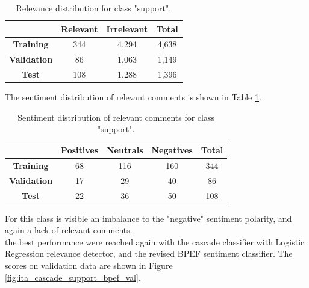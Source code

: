 \begin{table}[H]
	\centering
	\begin{tabular}{ | c | c  c | c | } 
		\hline
		& \textbf{Relevant} & \textbf{Irrelevant} & \textbf{Total} \\
		\hline
		\textbf{Training} & 344 & 4,294 & 4,638 \\ 
		\hline
		\textbf{Validation} & 86 & 1,063 & 1,149 \\ 
		\hline
		\textbf{Test} & 108 & 1,288 & 1,396 \\
		\hline
	\end{tabular}
	\caption{Relevance distribution for class "support".}
	\label{table:rel-dist-support}
\end{table}

The sentiment distribution of relevant comments is shown in Table \ref{table:rel-dist-support}.

\begin{table}[H]
	\centering
	\begin{tabular}{ | c | c  c c | c | } 
		\hline
		& \textbf{Positives} & \textbf{Neutrals} & \textbf{Negatives} & \textbf{Total} \\
		\hline
		\textbf{Training} & 68 & 116 & 160 & 344 \\ 
		\hline
		\textbf{Validation} & 17 & 29 & 40 & 86 \\ 
		\hline
		\textbf{Test} & 22 & 36 & 50 & 108 \\
		\hline
	\end{tabular}
	\label{table:snt-dist-support}
	\caption{Sentiment distribution of relevant comments for class "support".}
\end{table}

For this class is visible an imbalance to the "negative" sentiment polarity, and again a lack of relevant comments.\\
the best performance were reached again with the cascade classifier with Logistic Regression relevance detector, and the revised BPEF sentiment classifier. The scores on validation data are shown in Figure \ref{fig:ita_cascade_support_bpef_val}.


